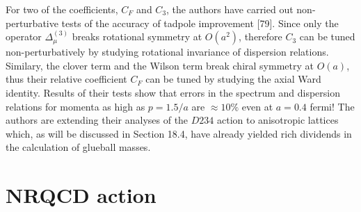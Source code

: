For two of the coefficients, $C_F$ and $C_3$, the authors have carried
out non-perturbative tests of the accuracy of tadpole improvement
[79].  Since only the operator $\Delta_\mu^{(3)}$ breaks
rotational symmetry at $O(a^2)$, therefore $C_3$ can be tuned
non-perturbatively by studying rotational invariance of dispersion
relations.  Similary, the clover term and the Wilson term break chiral
symmetry at $O(a)$, thus their relative coefficient $C_F$ can be tuned
by studying the axial Ward identity.  Results of their tests show that
errors in the spectrum and dispersion relations for momenta as high as
$p = 1.5/a$ are $\approx 10\%$ even at $a = 0.4$ fermi!  The authors
are extending their analyses of the $D234$ action to anisotropic
lattices which, as will be discussed in Section 18.4,
have already yielded rich dividends in the calculation of glueball
masses.

\section{NRQCD action}

